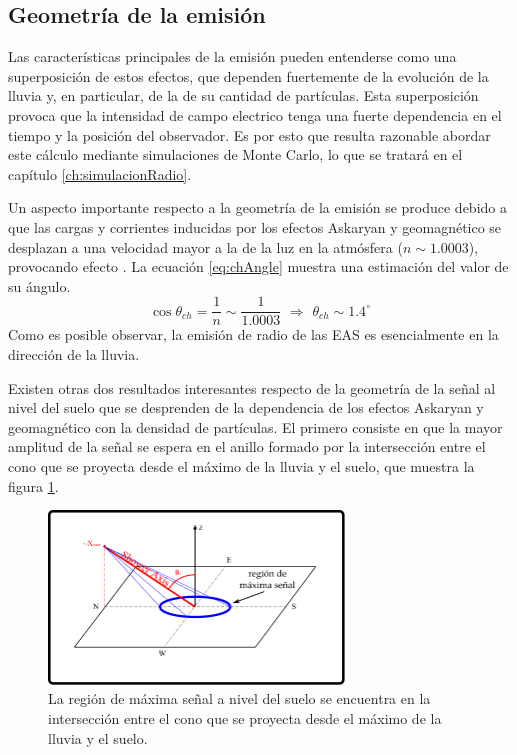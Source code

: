 	
	\subsection{Geometr\'ia de la emisi\'on}
	\label{sbsc:geom_emision}
	
	Las características principales de la emisión pueden entenderse como una superposición de estos efectos, que dependen fuertemente de la evolución de la lluvia y, en particular, de la de su cantidad de partículas.
	Esta superposición provoca que la intensidad de campo electrico tenga una fuerte dependencia en el tiempo y la posición del observador.
	Es por esto que resulta razonable abordar este cálculo mediante simulaciones de Monte Carlo, lo que se tratará en el capítulo \ref{ch:simulacionRadio}.
	
	Un aspecto importante respecto a la geometría de la emisión se produce debido a que las cargas y corrientes inducidas por los efectos Askaryan y geomagn\'etico se desplazan a una velocidad mayor a la de la luz en la atm\'osfera ($n\sim1.0003$), provocando efecto \cher{}.
	La ecuación \ref{eq:chAngle} muestra una estimación del valor de su \'angulo.
	\begin{equation}
	\cos\theta_{ch} = \frac{1}{n} \sim \frac{1}{1.0003}
	\,\, \Rightarrow \,\,
	\theta_{ch} \sim 1.4^\circ
	\label{eq:chAngle}
	\end{equation}
	Como es posible observar, la emisi\'on de radio de las EAS es esencialmente en la direcci\'on de la lluvia.
	
	Existen otras dos resultados interesantes respecto de la geometría de la señal al nivel del suelo que se desprenden de la dependencia de los efectos Askaryan y geomagnético con la densidad de partículas.
	El primero consiste en que la mayor amplitud de la señal se espera en el anillo formado por la intersección entre el cono \cher{} que se proyecta desde el máximo de la lluvia y el suelo, que muestra la figura \ref{fig:cono}.
	
	\begin{figure}[ht!]
		\centering
		\includegraphics[width=0.7\textwidth]{fig/EASRadio/chConeSch}
		\caption{\label{fig:cono} La región de máxima señal a nivel del suelo se encuentra en la intersección entre el cono \cher{} que se proyecta desde el máximo de la lluvia y el suelo.}
	\end{figure}
	
